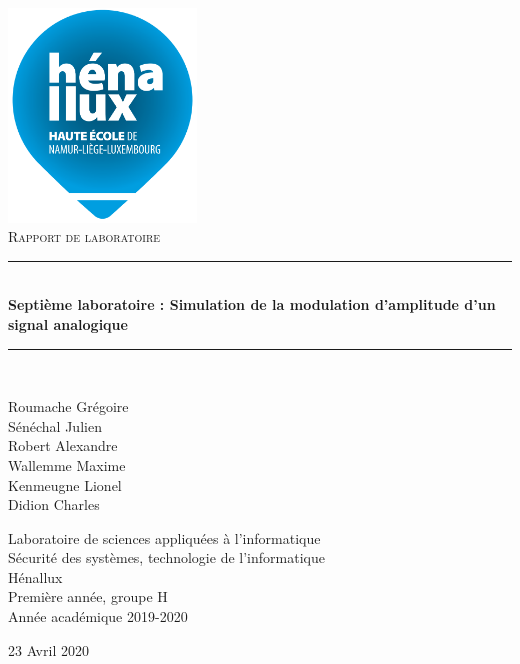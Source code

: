 \documentclass[a4paper]{article}
\newcommand{\HRule}{\rule{\linewidth}{0.5mm}}
\begin{document}
\begin{titlepage}
    \begin{sffamily}
        \begin{center}
            \includegraphics[width=5cm]{images/LogoHenallux.PNG}~\\[1.5cm]
            \textsc{\Large Rapport de laboratoire}\\[1.5cm]

            \HRule \\[0.4cm]
            { \huge \bfseries Septième laboratoire : Simulation de la modulation
            d'amplitude d'un signal analogique \\[0.4cm] }
            \HRule \\[2cm]

            \begin{minipage}{0.4\textwidth}
                \begin{flushleft} \large
                    Roumache Grégoire\\
                    Sénéchal Julien\\
                    Robert Alexandre\\
                    Wallemme Maxime\\
                    Kenmeugne Lionel\\
                    Didion Charles
                \end{flushleft}
            \end{minipage}
            \begin{minipage}{0.55\textwidth}
                \begin{flushright} \large
                    Laboratoire de sciences appliquées à l'informatique\\
                    Sécurité des systèmes, technologie de l'informatique\\
                    Hénallux\\
                    Première année, groupe H \\
                    Année académique 2019-2020\\
                \end{flushright}
            \end{minipage}
            \vfill

            {\large 23 Avril 2020}
        \end{center}
    \end{sffamily}
\end{titlepage}
\end{document}
